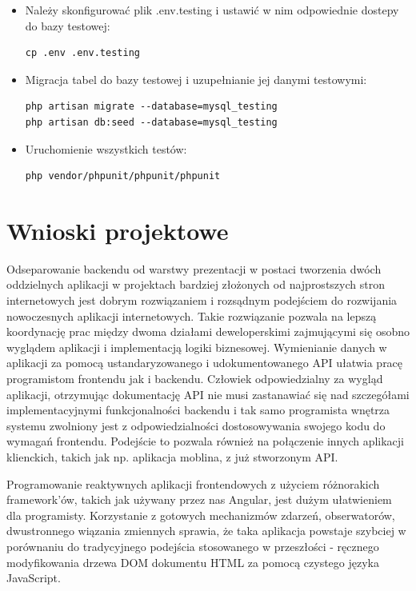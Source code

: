\documentclass[12pt]{article}
\begin{document}
\begin{itemize}
\item Należy skonfigurować plik .env.testing i ustawić w nim odpowiednie dostepy do bazy testowej:

\begin{lstlisting}[]
cp .env .env.testing
\end{lstlisting}

\item Migracja tabel do bazy testowej i uzupełnianie jej danymi testowymi:

\begin{lstlisting}[]
php artisan migrate --database=mysql_testing
php artisan db:seed --database=mysql_testing
\end{lstlisting}

\item Uruchomienie wszystkich testów:

\begin{lstlisting}[]
php vendor/phpunit/phpunit/phpunit
\end{lstlisting}

\end{itemize}

\clearpage

\section{Wnioski projektowe}
\vspace{1cm}
Odseparowanie backendu od warstwy prezentacji w postaci tworzenia dwóch oddzielnych aplikacji w projektach bardziej złożonych od najprostszych stron internetowych jest dobrym rozwiązaniem i rozsądnym podejściem do rozwijania nowoczesnych aplikacji internetowych. Takie rozwiązanie pozwala na lepszą koordynację prac między dwoma działami deweloperskimi zajmującymi się osobno wyglądem aplikacji i implementacją logiki biznesowej. Wymienianie danych w aplikacji za pomocą ustandaryzowanego i udokumentowanego API ułatwia pracę programistom frontendu jak i backendu. Człowiek odpowiedzialny za wygląd aplikacji, otrzymując dokumentację API nie musi zastanawiać się nad szczegółami implementacyjnymi funkcjonalności backendu i tak samo programista wnętrza systemu zwolniony jest z odpowiedzialności dostosowywania swojego kodu do wymagań frontendu. Podejście to pozwala również na połączenie innych aplikacji klienckich, takich jak np. aplikacja moblina, z już stworzonym API. 

Programowanie reaktywnych aplikacji frontendowych z użyciem różnorakich framework'ów, takich jak używany przez nas Angular, jest dużym ułatwieniem dla programisty. Korzystanie z gotowych mechanizmów zdarzeń, obserwatorów, dwustronnego wiązania zmiennych sprawia, że taka aplikacja powstaje szybciej w porównaniu do tradycyjnego podejścia stosowanego w przeszłości - ręcznego modyfikowania drzewa DOM dokumentu HTML za pomocą czystego języka JavaScript.
\end{document}
